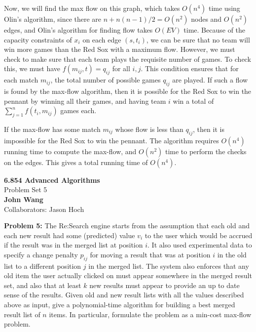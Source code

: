 \documentclass[psamsfonts]{amsart}
\newenvironment{sol}{\vspace{0.25cm}{\large \bfseries Solution:}}{\qedsymbol}
\newenvironment{prob}[1]{\begin{framed}{\large \bfseries Problem #1:}}{\end{framed}}
\newcommand{\makenewtitle}{
    \begin{center}
    {\huge \bfseries 6.854 Advanced Algorithms} \\
    Problem Set 5\\
    \vspace{0.25cm}
    {\bfseries John Wang} \\
    Collaborators: Jason Hoch
    \end{center}
    \vspace{0.5cm}
}
\begin{document}
\begin{sol}
Now, we will find the max flow on this graph, which takes $O(n^4)$ time using Olin's algorithm, since there are $n + n(n-1)/2 = O(n^2)$ nodes and $O(n^2)$ edges, and Olin's algorithm for finding flow takes $O(EV)$ time. Because of the capacity constraints of $x_i$ on each edge $(s,t_i)$, we can be sure that no team will win more games than the Red Sox with a maximum flow. However, we must check to make sure that each team plays the requisite number of games. To check this, we must have $f(m_{ij}, t) = q_{ij}$ for all $i,j$. This condition ensures that for each match $m_{ij}$, the total number of possible games $q_{ij}$ are played. If such a flow is found by the max-flow algorithm, then it is possible for the Red Sox to win the pennant by winning all their games, and having team $i$ win a total of $\sum_{j=1}^n f(t_i, m_{ij})$ games each. 

If the max-flow has some match $m_{ij}$ whose flow is less than $q_{ij}$, then it is impossible for the Red Sox to win the pennant. The algorithm requires $O(n^4)$ running time to compute the max-flow, and $O(n^2)$ time to perform the checks on the edges. This gives a total running time of $O(n^4)$.
\end{sol}

\newpage
\makenewtitle

\begin{prob}{5}
The Re:Search engine starts from the assumption that each old and each new result had some (predicted) value $v_i$ to the user which would be accrued if the result was in the merged list at position $i$. It also used experimental data to specify a change penalty $p_{ij}$ for moving a result that was at position $i$ in the old list to a different position $j$ in the merged list. The system also enforces that any old item the user actually clicked on must appear somewhere in the merged result set, and also that at least $k$ new results must appear to provide an up to date sense of the results. Given old and new result lists with all the values described above as input, give a polynomial-time algorithm for building a best merged result list of $n$ items. In particular, formulate the problem as a min-cost max-flow problem.
\end{prob}
\begin{sol}
\end{sol}
\end{document}

